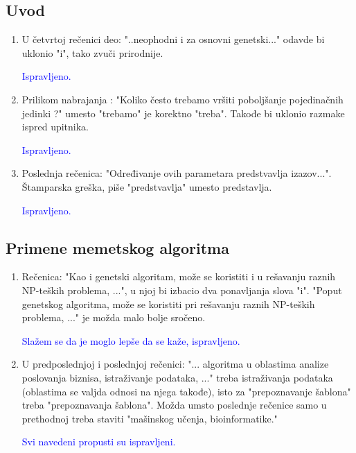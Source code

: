 \documentclass[a4paper]{report}
\newcommand{\odgovor}[1]{\textcolor{blue}{#1}}
\begin{document}
\subsection{Uvod}
\begin{enumerate}
  \item U četvrtoj rečenici deo:  "..neophodni i za osnovni genetski..."  odavde bi uklonio "i", tako zvuči prirodnije.
  
  \odgovor{Ispravljeno.}
  
  \item Prilikom nabrajanja : "Koliko često trebamo vršiti poboljšanje pojedinačnih jedinki ?" umesto "trebamo" je korektno "treba". Takođe bi uklonio razmake ispred upitnika.
  
  \odgovor{Ispravljeno.}
  
  \item Poslednja rečenica: "Određivanje ovih parametara predstvavlja izazov...". Štamparska greška, piše "predstvavlja" umesto predstavlja.
  
  \odgovor{Ispravljeno.}
  
\end{enumerate}

\subsection{Primene memetskog algoritma}

\begin{enumerate}
  \item Rečenica: "Kao i genetski algoritam, može se koristiti i u rešavanju raznih
NP-teških problema, ...", u njoj bi izbacio dva ponavljanja slova "i". "Poput genetskog algoritma, može se koristiti pri rešavanju raznih NP-teških problema, ..." je možda malo bolje sročeno.

  \odgovor{Slažem se da je moglo lepše da se kaže, ispravljeno.}
  
  \item U predposlednjoj i poslednjoj rečenici: "... algoritma u oblastima analize poslovanja biznisa, istraživanje podataka, ..." treba istraživanja podataka (oblastima se valjda odnosi na njega takođe), isto za "prepoznavanje šablona" treba "prepoznavanja šablona". Možda umsto poslednje rečenice samo u prethodnoj treba staviti "mašinskog učenja, bioinformatike."
  
  \odgovor{Svi navedeni propusti su ispravljeni.}
  
\end{enumerate}
\end{document}
